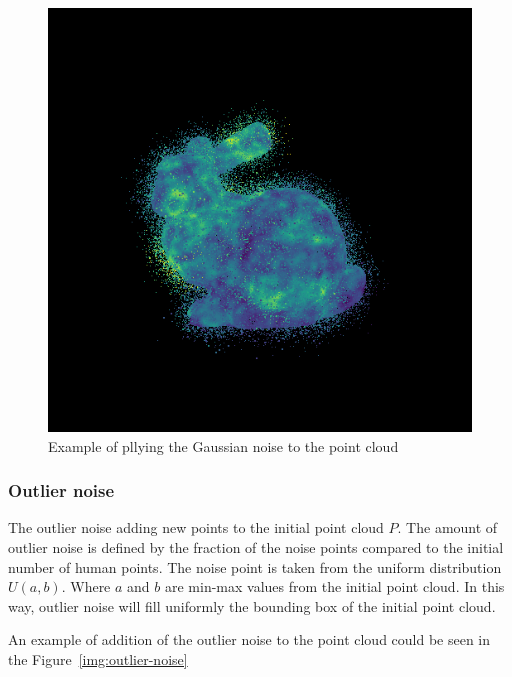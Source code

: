 \begin{figure}[htbp]
    \centerline{\includegraphics[scale=.6]{Figures/coords_gaussian.png}}
    \caption{Example of pllying the Gaussian noise to the point cloud \parencite{uchida_tom-uchidaadd_noise_to_point_cloud_2021}}
    \label{img:gaussian-noise}
\end{figure}

\subsubsection{Outlier noise}
The outlier noise adding new points to the initial point cloud $P$. The amount of outlier noise is defined by the fraction of the noise points compared to the initial number of human points. The noise point is taken from the uniform distribution $U(a, b)$. Where $a$ and $b$ are min-max values from the initial point cloud. In this way, outlier noise will fill uniformly the bounding box of the initial point cloud.

An example of addition of the outlier noise to the point cloud could be seen in the Figure~\ref{img:outlier-noise}

